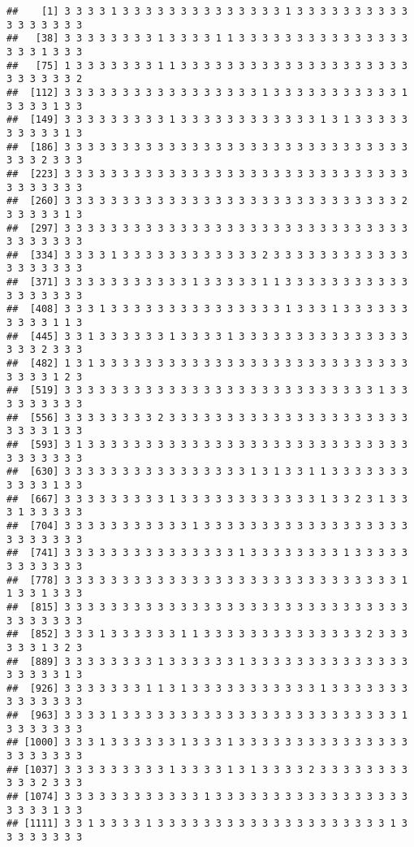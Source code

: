 \documentclass[
]{article}
\begin{document}
\begin{verbatim}
##    [1] 3 3 3 3 1 3 3 3 3 3 3 3 3 3 3 3 3 3 3 1 3 3 3 3 3 3 3 3 3 3 3 3 3 3 3 3 3
##   [38] 3 3 3 3 3 3 3 3 1 3 3 3 3 1 1 3 3 3 3 3 3 3 3 3 3 3 3 3 3 3 3 3 3 1 3 3 3
##   [75] 1 3 3 3 3 3 3 3 1 1 3 3 3 3 3 3 3 3 3 3 3 3 3 3 3 3 3 3 3 3 3 3 3 3 3 3 2
##  [112] 3 3 3 3 3 3 3 3 3 3 3 3 3 3 3 3 3 1 3 3 3 3 3 3 3 3 3 3 3 1 3 3 3 3 1 3 3
##  [149] 3 3 3 3 3 3 3 3 3 1 3 3 3 3 3 3 3 3 3 3 3 3 1 3 1 3 3 3 3 3 3 3 3 3 3 1 3
##  [186] 3 3 3 3 3 3 3 3 3 3 3 3 3 3 3 3 3 3 3 3 3 3 3 3 3 3 3 3 3 3 3 3 3 2 3 3 3
##  [223] 3 3 3 3 3 3 3 3 3 3 3 3 3 3 3 3 3 3 3 3 3 3 3 3 3 3 3 3 3 3 3 3 3 3 3 3 3
##  [260] 3 3 3 3 3 3 3 3 3 3 3 3 3 3 3 3 3 3 3 3 3 3 3 3 3 3 3 3 3 2 3 3 3 3 3 1 3
##  [297] 3 3 3 3 3 3 3 3 3 3 3 3 3 3 3 3 3 3 3 3 3 3 3 3 3 3 3 3 3 3 3 3 3 3 3 3 3
##  [334] 3 3 3 3 1 3 3 3 3 3 3 3 3 3 3 3 3 2 3 3 3 3 3 3 3 3 3 3 3 3 3 3 3 3 3 3 3
##  [371] 3 3 3 3 3 3 3 3 3 3 3 1 3 3 3 3 3 1 1 3 3 3 3 3 3 3 3 3 3 3 3 3 3 3 3 3 3
##  [408] 3 3 3 1 3 3 3 3 3 3 3 3 3 3 3 3 3 3 3 1 3 3 3 1 3 3 3 3 3 3 3 3 3 3 1 1 3
##  [445] 3 3 1 3 3 3 3 3 3 1 3 3 3 3 1 3 3 3 3 3 3 3 3 3 3 3 3 3 3 3 3 3 3 2 3 3 3
##  [482] 1 3 1 3 3 3 3 3 3 3 3 3 3 3 3 3 3 3 3 3 3 3 3 3 3 3 3 3 3 3 3 3 3 3 1 2 3
##  [519] 3 3 3 3 3 3 3 3 3 3 3 3 3 3 3 3 3 3 3 3 3 3 3 3 3 3 3 1 3 3 3 3 3 3 3 3 3
##  [556] 3 3 3 3 3 3 3 3 2 3 3 3 3 3 3 3 3 3 3 3 3 3 3 3 3 3 3 3 3 3 3 3 3 3 1 3 3
##  [593] 3 1 3 3 3 3 3 3 3 3 3 3 3 3 3 3 3 3 3 3 3 3 3 3 3 3 3 3 3 3 3 3 3 3 3 3 3
##  [630] 3 3 3 3 3 3 3 3 3 3 3 3 3 3 3 3 1 3 1 3 3 1 1 3 3 3 3 3 3 3 3 3 3 3 1 3 3
##  [667] 3 3 3 3 3 3 3 3 3 1 3 3 3 3 3 3 3 3 3 3 3 3 1 3 3 2 3 1 3 3 3 1 3 3 3 3 3
##  [704] 3 3 3 3 3 3 3 3 3 3 3 1 3 3 3 3 3 3 3 3 3 3 3 3 3 3 3 3 3 3 3 3 3 3 3 3 3
##  [741] 3 3 3 3 3 3 3 3 3 3 3 3 3 3 3 1 3 3 3 3 3 3 3 3 1 3 3 3 3 3 3 3 3 3 3 3 3
##  [778] 3 3 3 3 3 3 3 3 3 3 3 3 3 3 3 3 3 3 3 3 3 3 3 3 3 3 3 3 3 1 1 3 3 1 3 3 3
##  [815] 3 3 3 3 3 3 3 3 3 3 3 3 3 3 3 3 3 3 3 3 3 3 3 3 3 3 3 3 3 3 3 3 3 3 3 3 3
##  [852] 3 3 3 1 3 3 3 3 3 3 1 1 3 3 3 3 3 3 3 3 3 3 3 3 3 3 2 3 3 3 3 3 3 1 3 2 3
##  [889] 3 3 3 3 3 3 3 3 1 3 3 3 3 3 3 1 3 3 3 3 3 3 3 3 3 3 3 3 3 3 3 3 3 3 3 1 3
##  [926] 3 3 3 3 3 3 3 1 1 3 1 3 3 3 3 3 3 3 3 3 3 3 1 3 3 3 3 3 3 3 3 3 3 3 3 3 3
##  [963] 3 3 3 3 1 3 3 3 3 3 3 3 3 3 3 3 3 3 3 3 3 3 3 3 3 3 3 3 3 1 3 3 3 3 3 3 3
## [1000] 3 3 3 1 3 3 3 3 3 3 1 3 3 3 1 3 3 3 3 3 3 3 3 3 3 3 3 3 3 3 3 3 3 3 3 3 3
## [1037] 3 3 3 3 3 3 3 3 3 1 3 3 3 3 1 3 1 3 3 3 3 2 3 3 3 3 3 3 3 3 3 3 3 2 3 3 3
## [1074] 3 3 3 3 3 3 3 3 3 3 3 3 1 3 3 3 3 3 3 3 3 3 3 3 3 3 3 3 3 3 3 3 3 3 1 3 3
## [1111] 3 3 1 3 3 3 3 1 3 3 3 3 3 3 3 3 3 3 3 3 3 3 3 3 3 3 3 3 1 3 3 3 3 3 3 3 3

\end{verbatim}
\end{document}
